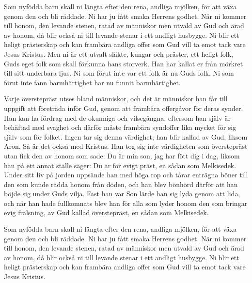 {Som nyfödda barn skall ni längta efter den rena, andliga mjölken, för att växa genom den och bli räddade.
Ni har ju fått smaka Herrens godhet.
När ni kommer till honom, den levande stenen, ratad av människor men utvald av Gud och ärad av honom,
då blir också ni till levande stenar i ett andligt husbygge. Ni blir ett heligt prästerskap och kan frambära andliga offer som Gud vill ta emot tack vare Jesus Kristus.
Men ni är ett utvalt släkte, kungar och präster, ett heligt folk, Guds eget folk som skall förkunna hans storverk. Han har kallat er från mörkret till sitt underbara ljus.
Ni som förut inte var ett folk är nu Guds folk. Ni som förut inte fann barmhärtighet har nu funnit barmhärtighet.}

\pagebreak

{Varje överstepräst utses bland människor, och det är människor han får till uppgift att företräda inför Gud, genom att frambära offergåvor för deras synder.
Han kan ha fördrag med de okunniga och vilsegångna, eftersom han själv är behäftad med svaghet
och därför måste frambära syndoffer lika mycket för sig själv som för folket.
Ingen tar sig denna värdighet; han blir kallad av Gud, liksom Aron.
Så är det också med Kristus. Han tog sig inte värdigheten som överstepräst utan fick den av honom som sade: Du är min son, jag har fött dig i dag,
liksom han på ett annat ställe säger: Du är för evigt präst, en sådan som Melkisedek.
Under sitt liv på jorden uppsände han med höga rop och tårar enträgna böner till den som kunde rädda honom från döden, och han blev bönhörd därför att han böjde sig under Guds vilja.
Fast han var Son lärde han sig lyda genom att lida,
och när han hade fullkomnats blev han för alla som lyder honom den som bringar evig frälsning,
av Gud kallad överstepräst, en sådan som Melkisedek.}


{Som nyfödda barn skall ni längta efter den rena, andliga mjölken, för att växa genom den och bli räddade.
Ni har ju fått smaka Herrens godhet.
När ni kommer till honom, den levande stenen, ratad av människor men utvald av Gud och ärad av honom,
då blir också ni till levande stenar i ett andligt husbygge. Ni blir ett heligt prästerskap och kan frambära andliga offer som Gud vill ta emot tack vare Jesus Kristus.}


